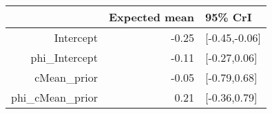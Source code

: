 \begin{tabular}{rrl}
  \hline
 & Expected mean & 95\% CrI \\ 
  \hline
Intercept & -0.25 & [-0.45,-0.06] \\ 
  phi\_Intercept & -0.11 & [-0.27,0.06] \\ 
  cMean\_prior & -0.05 & [-0.79,0.68] \\ 
  phi\_cMean\_prior & 0.21 & [-0.36,0.79] \\ 
   \hline
\end{tabular}

